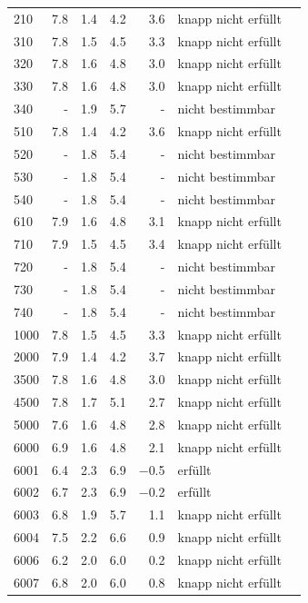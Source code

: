 {\begin{longtable}{p{1.6cm} r r r r l p{3.6cm}}
        210 & 7.8 & 1.4 & 4.2 & 3.6 & knapp nicht erfüllt &  \\
        310 & 7.8 & 1.5 & 4.5 & 3.3 & knapp nicht erfüllt &  \\
        320 & 7.8 & 1.6 & 4.8 & 3.0 & knapp nicht erfüllt &  \\
        330 & 7.8 & 1.6 & 4.8 & 3.0 & knapp nicht erfüllt &  \\
        340 & - & 1.9 & 5.7 & - & nicht bestimmbar &  \\
        510 & 7.8 & 1.4 & 4.2 & 3.6 & knapp nicht erfüllt &  \\
        520 & - & 1.8 & 5.4 & - & nicht bestimmbar &  \\
        530 & - & 1.8 & 5.4 & - & nicht bestimmbar &  \\
        540 & - & 1.8 & 5.4 & - & nicht bestimmbar &  \\
        610 & 7.9 & 1.6 & 4.8 & 3.1 & knapp nicht erfüllt &  \\
        710 & 7.9 & 1.5 & 4.5 & 3.4 & knapp nicht erfüllt &  \\
        720 & - & 1.8 & 5.4 & - & nicht bestimmbar &  \\
        730 & - & 1.8 & 5.4 & - & nicht bestimmbar &  \\
        740 & - & 1.8 & 5.4 & - & nicht bestimmbar &  \\
        1000 & 7.8 & 1.5 & 4.5 & 3.3 & knapp nicht erfüllt &  \\
        2000 & 7.9 & 1.4 & 4.2 & 3.7 & knapp nicht erfüllt &  \\
        3500 & 7.8 & 1.6 & 4.8 & 3.0 & knapp nicht erfüllt &  \\
        4500 & 7.8 & 1.7 & 5.1 & 2.7 & knapp nicht erfüllt &  \\
        5000 & 7.6 & 1.6 & 4.8 & 2.8 & knapp nicht erfüllt &  \\
        6000 & 6.9 & 1.6 & 4.8 & 2.1 & knapp nicht erfüllt &  \\
        6001 & 6.4 & 2.3 & 6.9 & $-$0.5 & erfüllt &  \\
        6002 & 6.7 & 2.3 & 6.9 & $-$0.2 & erfüllt &  \\
        6003 & 6.8 & 1.9 & 5.7 & 1.1 & knapp nicht erfüllt &  \\
        6004 & 7.5 & 2.2 & 6.6 & 0.9 & knapp nicht erfüllt &  \\
        6006 & 6.2 & 2.0 & 6.0 & 0.2 & knapp nicht erfüllt &  \\
        6007 & 6.8 & 2.0 & 6.0 & 0.8 & knapp nicht erfüllt &  \\

\end{longtable}}
